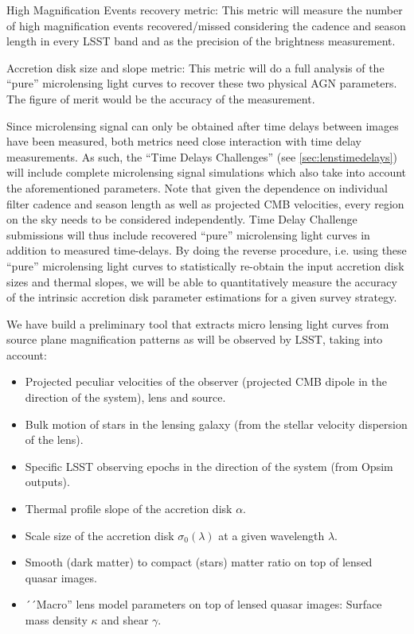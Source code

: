High Magnification Events recovery metric: This metric will measure the
number of high magnification events recovered/missed considering the
cadence and season length in every LSST band and as the precision of the
brightness measurement.



Accretion disk size and slope metric: This metric will do a full
analysis of the ``pure'' microlensing light curves to recover these two
physical AGN parameters. The figure of merit would be the accuracy of
the measurement.

Since microlensing signal can only be obtained after time delays between images
have been measured, both metrics need close interaction with time delay
measurements. As such, the ``Time Delays Challenges'' (see
\autoref{sec:lenstimedelays}) will include complete microlensing signal
simulations which also take into account the aforementioned parameters. Note
that given
the dependence on individual filter cadence and season length as well as
projected CMB velocities, every region on the sky needs to be considered
independently. Time Delay Challenge submissions will thus include recovered
``pure'' microlensing
light curves in addition to measured time-delays. By doing the reverse
procedure, i.e. using these ``pure'' microlensing light curves to statistically
re-obtain the input accretion disk sizes and thermal slopes, we will be able to
quantitatively measure the accuracy of the intrinsic accretion disk parameter
estimations for a given survey strategy.



We have build a preliminary tool that extracts micro lensing light curves from source plane magnification patterns as will be observed by LSST, taking into account:
\begin{itemize}
\item Projected peculiar velocities of the observer (projected CMB dipole in the direction of the system), lens and source.
\item Bulk motion of stars in the lensing galaxy (from the stellar velocity dispersion of the lens).
\item Specific LSST observing epochs in the direction of the system (from Opsim outputs).
\item Thermal profile slope of the accretion disk $\alpha$.
\item Scale size of the accretion disk $\sigma_{0}(\lambda)$ at a given wavelength $\lambda$.
\item Smooth (dark matter) to compact (stars) matter ratio on top of lensed quasar images.
\item ´´Macro'' lens model parameters on top of lensed quasar images: Surface mass density $\kappa$ and shear $\gamma$.
\end{itemize}

